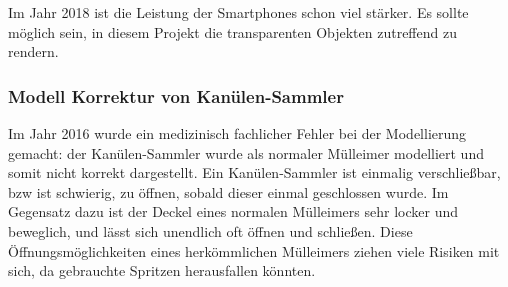    Im Jahr 2018 ist die Leistung der Smartphones schon viel stärker. Es sollte möglich sein, in diesem Projekt die transparenten Objekten zutreffend zu rendern.
   
   \subsubsection{Modell Korrektur von Kanülen-Sammler}
   Im Jahr 2016 wurde ein medizinisch fachlicher Fehler bei der Modellierung gemacht: der Kanülen-Sammler wurde als normaler Mülleimer modelliert und somit nicht korrekt dargestellt. Ein Kanülen-Sammler ist einmalig verschließbar, bzw ist schwierig, zu öffnen, sobald dieser einmal geschlossen wurde. Im Gegensatz dazu ist der Deckel eines normalen Mülleimers sehr locker und beweglich, und lässt sich unendlich oft öffnen und schließen. Diese Öffnungsmöglichkeiten eines herkömmlichen Mülleimers ziehen viele Risiken mit sich, da gebrauchte Spritzen herausfallen könnten.
   
